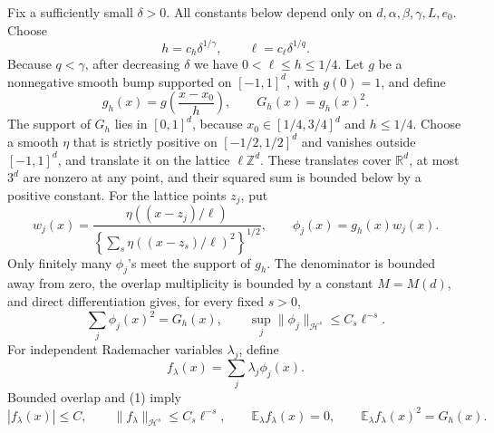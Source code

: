 Fix a sufficiently small \(\delta>0\).  All constants below depend only on \(d,\alpha,\beta,\gamma,L,e_0\).  Choose
\[
 h=c_h\delta^{1/\gamma},\qquad \ell=c_\ell\delta^{1/q}.
\]
Because \(q<\gamma\), after decreasing \(\delta\) we have \(0<\ell\le h\le1/4\).  Let \(g\) be a nonnegative smooth bump supported on \([-1,1]^d\), with \(g(0)=1\), and define
\[
 g_h(x)=g\!\left(\frac{x-x_0}{h}\right),\qquad G_h(x)=g_h(x)^2.
\]
The support of \(G_h\) lies in \([0,1]^d\), because \(x_0\in[1/4,3/4]^d\) and \(h\le1/4\).  Choose a smooth \(\eta\) that is strictly positive on \([-1/2,1/2]^d\) and vanishes outside \([-1,1]^d\), and translate it on the lattice \(\ell\mathbb Z^d\).  These translates cover \(\mathbb R^d\), at most \(3^d\) are nonzero at any point, and their squared sum is bounded below by a positive constant.  For the lattice points \(z_j\), put
\[
 w_j(x)=\frac{\eta((x-z_j)/\ell)}{\left\{\sum_s\eta((x-z_s)/\ell)^2\right\}^{1/2}},
 \qquad \phi_j(x)=g_h(x)w_j(x).
\]
Only finitely many \(\phi_j\)'s meet the support of \(g_h\).  The denominator is bounded away from zero, the overlap multiplicity is bounded by a constant \(M=M(d)\), and direct differentiation gives, for every fixed \(s>0\),
\[
 \sum_j\phi_j(x)^2=G_h(x),\qquad
 \sup_j\|\phi_j\|_{\mathcal H^s}\le C_s\ell^{-s}.
 \tag{1}
\]
For independent Rademacher variables \(\lambda_j\), define
\[
 f_\lambda(x)=\sum_j\lambda_j\phi_j(x).
\]
Bounded overlap and (1) imply
\[
 |f_\lambda(x)|\le C,\qquad
 \|f_\lambda\|_{\mathcal H^s}\le C_s\ell^{-s},\qquad
 \mathbb E_\lambda f_\lambda(x)=0,\qquad
 \mathbb E_\lambda f_\lambda(x)^2=G_h(x).
 \tag{2}
\]

